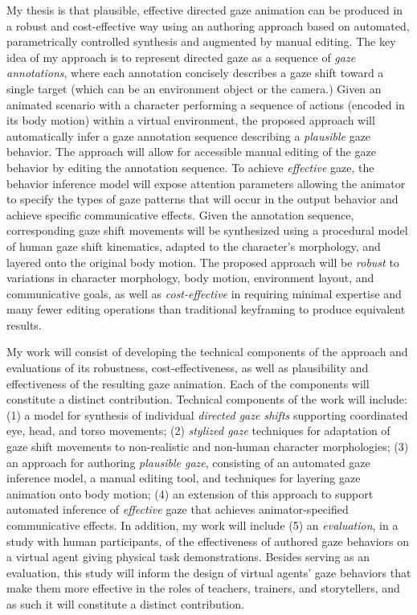 My thesis is that plausible, effective directed gaze animation can be produced in a robust and cost-effective way using an authoring approach based on automated, parametrically controlled synthesis and augmented by manual editing. The key idea of my approach is to represent directed gaze as a sequence of \emph{gaze annotations}, where each annotation concisely describes a gaze shift toward a single target (which can be an environment object or the camera.) Given an animated scenario with a character performing a sequence of actions (encoded in its body motion) within a virtual environment, the proposed approach will automatically infer a gaze annotation sequence describing a \emph{plausible} gaze behavior. The approach will allow for accessible manual editing of the gaze behavior by editing the annotation sequence. To achieve \emph{effective} gaze, the behavior inference model will expose attention parameters allowing the animator to specify the types of gaze patterns that will occur in the output behavior and achieve specific communicative effects. Given the annotation sequence, corresponding gaze shift movements will be synthesized using a procedural model of human gaze shift kinematics, adapted to the character's morphology, and layered onto the original body motion. The proposed approach will be \emph{robust} to variations in character morphology, body motion, environment layout, and communicative goals, as well as \emph{cost-effective} in requiring minimal expertise and many fewer editing operations than traditional keyframing to produce equivalent results.

My work will consist of developing the technical components of the approach and evaluations of its robustness, cost-effectiveness, as well as plausibility and effectiveness of the resulting gaze animation. Each of the components will constitute a distinct contribution. Technical components of the work will include: (1) a model for synthesis of individual \emph{directed gaze shifts} supporting coordinated eye, head, and torso movements; (2) \emph{stylized gaze} techniques for adaptation of gaze shift movements to non-realistic and non-human character morphologies; (3) an approach for authoring \emph{plausible gaze}, consisting of an automated gaze inference model, a manual editing tool, and techniques for layering gaze animation onto body motion; (4) an extension of this approach to support automated inference of \emph{effective} gaze that achieves animator-specified communicative effects. In addition, my work will include (5) an \emph{evaluation}, in a study with human participants, of the effectiveness of authored gaze behaviors on a virtual agent giving physical task demonstrations. Besides serving as an evaluation, this study will inform the design of virtual agents' gaze behaviors that make them more effective in the roles of teachers, trainers, and storytellers, and as such it will constitute a distinct contribution.


